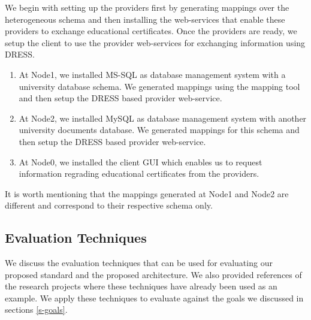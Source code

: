 \documentclass[12pt,a4paper,oneside]{book}
\begin{document}
We begin with setting up the providers first by generating mappings over the heterogeneous schema and then installing the web-services that enable these providers to exchange educational certificates. Once the providers are ready, we setup the client to use the provider web-services for exchanging information using DRESS.

	\begin{enumerate}  

		\item At Node1, we installed MS-SQL as database management system with a university database schema. We generated mappings using the mapping tool and then setup the DRESS based provider web-service.

		\item At Node2, we installed MySQL as database management system with another university documents  database. We generated mappings for this schema and then setup the DRESS based provider web-service. 
	
		\item At Node0, we installed the client GUI which enables us to request information regrading educational certificates from the providers. 

	\end{enumerate}
	
It is worth mentioning that the mappings generated at Node1 and Node2 are different and correspond to their respective schema only. \\

	\subsection{Evaluation Techniques}
	We discuss the evaluation techniques that can be used for evaluating our proposed standard and the proposed architecture. We also provided references of the research projects where these techniques have already been used as an example. We apply these techniques to evaluate against the goals we discussed in sections \ref{s-goals}. \\
	
	
\end{document}
